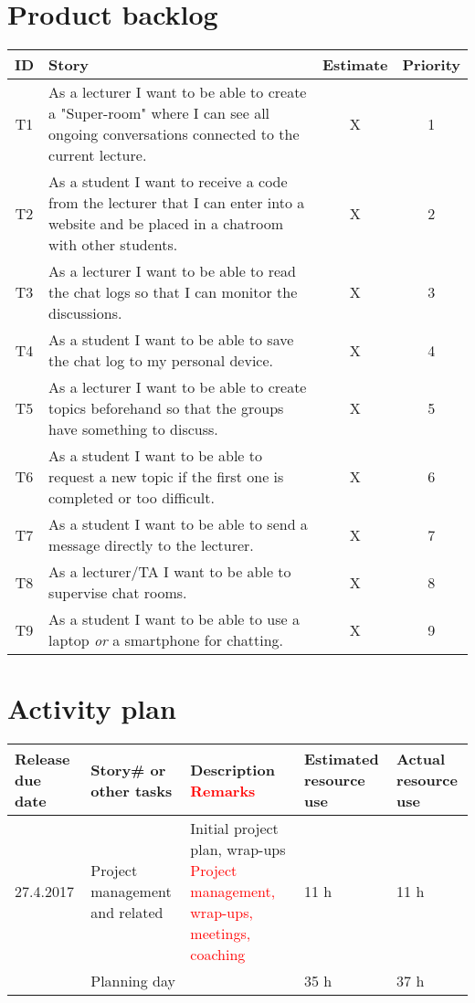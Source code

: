 \appendix

\section{Product backlog}
\label{app:Product backlog}
\begin{tabular}{ c | p{} | c | c}
     ID & Story & Estimate & Priority \\ \hline
     T1
     & As a lecturer I want to be able to create a "Super-room" where I can see all ongoing conversations connected to the current lecture.
     & X & 1 \\ \hline
     T2
     & As a student I want to receive a code from the lecturer that I can enter into a website and be placed in a chatroom with other students. 
     & X & 2 \\ \hline
     T3
     & As a lecturer I want to be able to read the chat logs so that I can monitor the discussions.
     & X & 3 \\ \hline
     T4
     & As a student I want to be able to save the chat log to my personal device.
     & X & 4 \\ \hline
     T5
     & As a lecturer I want to be able to create topics beforehand so that the groups have something to discuss.
     & X & 5 \\ \hline
     T6
     & As a student I want to be able to request a new topic if the first one is completed or too difficult. 
     & X & 6 \\ \hline
     T7
     & As a student I want to be able to send a message directly to the lecturer.
     & X & 7 \\ \hline
     T8
     & As a lecturer/TA I want to be able to supervise chat rooms. 
     & X & 8 \\ \hline
     T9
     & As a student I want to be able to use a laptop \emph{or} a smartphone for chatting. 
     & X & 9 \\ \hline
\end{tabular}

\newpage
\section{Activity plan}
\label{app:Activity plan}
\begin{adjustbox}{center}
\begin{tabular}{ p{0.1\paperwidth} | p{0.1\paperwidth} | p{} | p{0.1\paperwidth} | p{0.1\paperwidth} }
    Release due date & Story\# or other tasks & Description \newline \textcolor{red}{Remarks} & Estimated resource use & Actual resource use \\ \hline
    27.4.2017 & Project management and related & Initial project plan, wrap-ups \textcolor{red}{Project management, wrap-ups, meetings, coaching} & 11 h & 11 h \\ \cline{2-5}
     & Planning day &  & 35 h & 37 h \\ 
     
\end{tabular}
\end{adjustbox}

